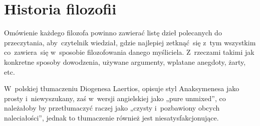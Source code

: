 \documentclass[a4paper,11pt]{article}
\begin{document}
\vspace{\spaceTwo}















\newpage

\section{Historia filozofii}

\vspace{\spaceTwo}




\vspace{0em}



\vspace{0em}


\noindent
Omówienie każdego filozofa powinno zawierać listę dzieł
polecanych do przeczytania, aby~czytelnik wiedział, gdzie najlepiej
zetknąć~się z~tym wszystkim co~zawiera~się w~sposobie filozofowania
danego myśliciela. Z~rzeczami takimi jak konkretne sposoby dowodzenia,
używane argumenty, wplatane anegdoty, żarty, etc.

\vspace{\spaceFour}







\noindent
{} W~polskiej tłumaczeniu Diogenesa Laertios, opisuje
styl Anaksymenesa jako prosty i~niewyszukany, zaś w~wersji angielskiej
jako „pure unmixed”, co należałoby by przetłumaczyć raczej jako
„czysty i~pozbawiony obcych naleciałości”, jednak to tłumaczenie
również jest niesatysfakcjonujące.

\vspace{\spaceFour}
\end{document}
